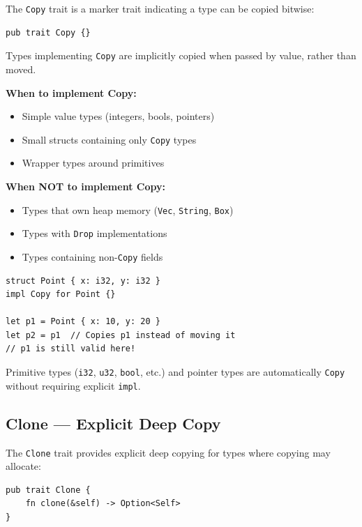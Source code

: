 The \texttt{Copy} trait is a marker trait indicating a type can be copied bitwise:

\begin{lstlisting}
pub trait Copy {}
\end{lstlisting}

Types implementing \texttt{Copy} are implicitly copied when passed by value, rather than moved.

\textbf{When to implement Copy:}
\begin{itemize}
    \item Simple value types (integers, bools, pointers)
    \item Small structs containing only \texttt{Copy} types
    \item Wrapper types around primitives
\end{itemize}

\textbf{When NOT to implement Copy:}
\begin{itemize}
    \item Types that own heap memory (\texttt{Vec}, \texttt{String}, \texttt{Box})
    \item Types with \texttt{Drop} implementations
    \item Types containing non-\texttt{Copy} fields
\end{itemize}

\begin{lstlisting}
struct Point { x: i32, y: i32 }
impl Copy for Point {}

let p1 = Point { x: 10, y: 20 }
let p2 = p1  // Copies p1 instead of moving it
// p1 is still valid here!
\end{lstlisting}

\begin{notebox}
Primitive types (\texttt{i32}, \texttt{u32}, \texttt{bool}, etc.) and pointer types are automatically \texttt{Copy} without requiring explicit \texttt{impl}.
\end{notebox}

\subsection{Clone --- Explicit Deep Copy}

The \texttt{Clone} trait provides explicit deep copying for types where copying may allocate:

\begin{lstlisting}
pub trait Clone {
    fn clone(&self) -> Option<Self>
}
\end{lstlisting}

